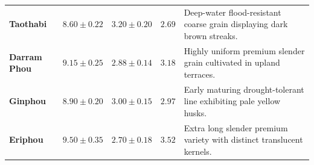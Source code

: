 \begin{table}[htbp]
\begin{tabularx}{\textwidth}{@{} l c c c X @{}}
    \addlinespace
    \textbf{Taothabi} & $8.60 \pm 0.22$ & $3.20 \pm 0.20$ & $2.69$ & Deep-water flood-resistant coarse grain displaying dark brown streaks. \\
    \addlinespace
    \textbf{Darram Phou} & $9.15 \pm 0.25$ & $2.88 \pm 0.14$ & $3.18$ & Highly uniform premium slender grain cultivated in upland terraces. \\
    \addlinespace
    \textbf{Ginphou} & $8.90 \pm 0.20$ & $3.00 \pm 0.15$ & $2.97$ & Early maturing drought-tolerant line exhibiting pale yellow husks. \\
    \addlinespace
    \textbf{Eriphou} & $9.50 \pm 0.35$ & $2.70 \pm 0.18$ & $3.52$ & Extra long slender premium variety with distinct translucent kernels. \\
    \bottomrule
  \end{tabularx}
\end{table}
